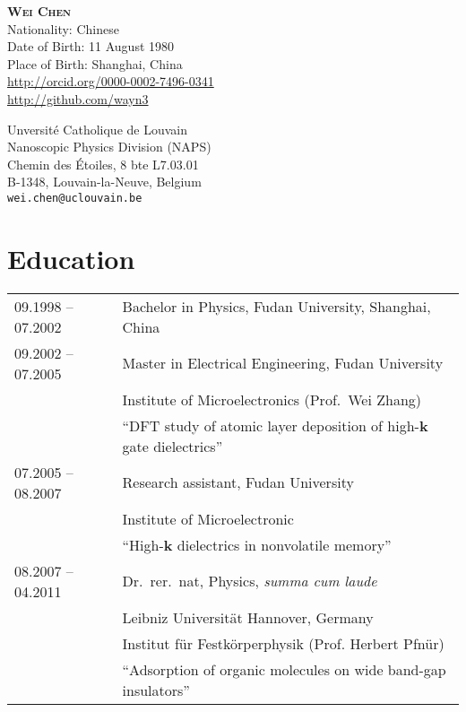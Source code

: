 \documentclass[a4paper, 11pt, DIV=15,headings=normal]{scrartcl}
\begin{document}
\begin{minipage}{0.55\linewidth}
{\textbf{\textsc{Wei Chen}}}\\
Nationality: Chinese \\
Date of Birth: 11 August 1980 \\
Place of Birth: Shanghai, China \\
\small \url{http://orcid.org/0000-0002-7496-0341} \\
\small \url{http://github.com/wayn3}
\end{minipage}\hfill
\begin{minipage}{0.40\linewidth}
Unversit\'{e} Catholique de Louvain\\
Nanoscopic Physics Division (NAPS)\\
Chemin des \'{E}toiles, 8 bte L7.03.01 \\
B-1348, Louvain-la-Neuve, Belgium \\
\texttt{wei.chen@uclouvain.be}
\end{minipage}
\vspace{6mm}

\section*{Education}
\begin{tabular}{ll}
09.1998 -- 07.2002 & Bachelor in Physics, Fudan University, Shanghai, China \\
09.2002 -- 07.2005 & Master in Electrical Engineering, Fudan University \\
                   & Institute of Microelectronics (Prof.\ Wei Zhang)\\
                   & ``DFT study of atomic layer deposition of high-$\mathbf{k}$ gate dielectrics''\\
07.2005 -- 08.2007 & Research assistant, Fudan University\\
                   & Institute of Microelectronic \\
                   & ``High-$\mathbf{k}$ dielectrics in nonvolatile memory'' \\
08.2007 -- 04.2011 & Dr.\ rer.\ nat, Physics, \emph{summa cum laude}  \\
                   & Leibniz Universit\"{a}t Hannover, Germany\\
                   & Institut f\"{u}r Festk\"{o}rperphysik (Prof. Herbert Pfn\"{u}r) \\
                   & ``Adsorption of organic molecules on wide band-gap insulators'' 
\end{tabular}
\end{document}
